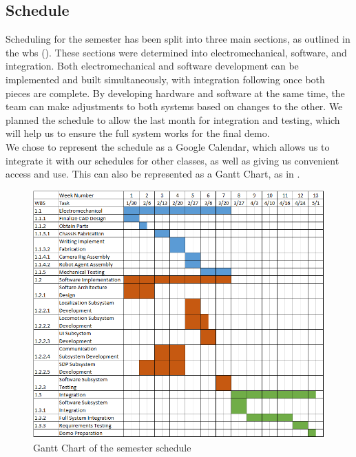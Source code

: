 \subsection{Schedule}
\label{sec:schedule}
Scheduling for the semester has been split into three main sections, as outlined in the wbs (). These sections were determined into electromechanical, software, and integration. Both electromechanical and software development can be implemented and built simultaneously, with integration following once both pieces are complete. By developing hardware and software at the same time, the team can make adjustments to both systems based on changes to the other. We planned the schedule to allow the last month for integration and testing, which will help us to ensure the full system works for the final demo. \\
We chose to represent the schedule as a Google Calendar, which allows us to integrate it with our schedules for other classes, as well as giving us convenient access and use. This can also be represented as a Gantt Chart, as in .

\begin{figure}[ht!]
 \centering
  \includegraphics[width=0.99\columnwidth]{figures/gantt_chart.png}
  \caption{Gantt Chart of the semester schedule}
 \label{fig:gantt_chart}
\end{figure}
